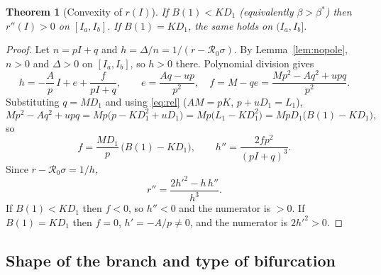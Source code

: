\documentclass[11pt]{article}
\newtheorem{theorem}[lemma]{Theorem}
\theoremstyle{remark}
\newcommand{\R}{\mathcal R_0}
\begin{document}
\begin{theorem}[Convexity of $r(I)$]\label{thm:convex}
If $B(1)<KD_1$ (equivalently $\beta>\beta^*$) then $r''(I)>0$ on $[I_a,I_b]$. If $B(1)=KD_1$, the same holds on $(I_a,I_b]$.
\end{theorem}
\begin{proof}
Let $n=pI+q$ and $h=\Delta/n=1/(r-\R\sigma)$. By Lemma~\ref{lem:nopole}, $n>0$ and $\Delta>0$ on $[I_a,I_b]$, so $h>0$ there. Polynomial division gives
\[
h=-\frac Ap\,I+e+\frac{f}{pI+q},\qquad e=\frac{Aq-up}{p^2},\quad f=M-qe=\frac{Mp^2-Aq^2+upq}{p^2}.
\]
Substituting $q=MD_1$ and using \eqref{eq:rel} ($AM=pK$, $p+uD_1=L_1$),
\[
Mp^2-Aq^2+upq=Mp\big(p-KD_1^2+uD_1\big)=Mp\big(L_1-KD_1^2\big)=MpD_1\big(B(1)-KD_1\big),
\]
so
\begin{equation}
f=\frac{M D_1}{p}\,\big(B(1)-KD_1\big),\qquad h''=\frac{2fp^2}{(pI+q)^3}.
\label{eq:f}
\end{equation}
Since $r-\R\sigma=1/h$,
\[
r''=\frac{2h'^2-h\,h''}{h^3}.
\]
If $B(1)<KD_1$ then $f<0$, so $h''<0$ and the numerator is $>0$. If $B(1)=KD_1$ then $f=0$, $h'=-A/p\ne0$, and the numerator is $2h'^2>0$.
\end{proof}

\subsection{Shape of the branch and type of bifurcation}
\end{document}
